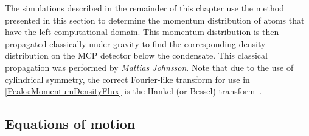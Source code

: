 \parasep

The simulations described in the remainder of this chapter use the method presented in this section to determine the momentum distribution of atoms that have the left computational domain. This momentum distribution is then propagated classically under gravity to find the corresponding density distribution on the MCP detector below the condensate. This classical propagation was performed by \emph{Mattias Johnsson}. Note that due to the use of cylindrical symmetry, the correct Fourier-like transform for use in \eqref{Peaks:MomentumDensityFlux} is the Hankel (or Bessel) transform~\citep{ArfkenWeber}.

\subsection{Equations of motion}
\label{Peaks:3DEquationsOfMotion}

